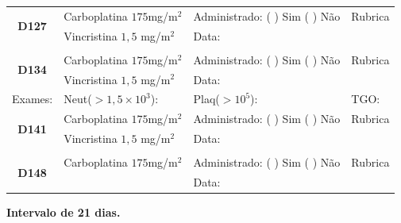 \documentclass[11pt,a4paper,oldfontcommands]{memoir}
\begin{document}
\begin{center}
\begin{longtable}{p{1cm}p{4cm}|p{5cm}|p{3cm}}
    \hline
    \multicolumn{1}{c|}{\multirow{2}{*}{\textbf{D127}}}&{Carboplatina \(175\)mg/m\(^2\)}&{Administrado: (  ) Sim (  ) Não}&{Rubrica}\\
    \multicolumn{1}{c|}{}&{Vincristina \(1,5\) mg/m\(^2\)}&{Data:}&\\
    \hline
    \\
    \hline
    \multicolumn{1}{c|}{\multirow{2}{*}{\textbf{D134}}}&{Carboplatina \(175\)mg/m\(^2\)}&{Administrado: (  ) Sim (  ) Não}&{Rubrica}\\
    \multicolumn{1}{c|}{}&{Vincristina \(1,5\) mg/m\(^2\)}&{Data:}&\\
    \hline
    \multicolumn{1}{c|}{Exames:}&{Neut(\(>1,5\times10^3\)):}&{Plaq(\(>10^5\)):}&{TGO:}
    \\
    \hline

    \hline
    \multicolumn{1}{c|}{\multirow{2}{*}{\textbf{D141}}}&{Carboplatina \(175\)mg/m\(^2\)}&{Administrado: (  ) Sim (  ) Não}&{Rubrica}\\
    \multicolumn{1}{c|}{}&{Vincristina \(1,5\) mg/m\(^2\)}&{Data:}&\\
    \hline
    \\
    \hline
    \multicolumn{1}{c|}{\multirow{2}{*}{\textbf{D148}}}&{Carboplatina \(175\)mg/m\(^2\)}&{Administrado: (  ) Sim (  ) Não}&{Rubrica}\\
	\multicolumn{1}{c|}{}&&{Data:}&\\
    \hline
\end{longtable}
\textbf{Intervalo de 21 dias.}
\end{center}
\end{document}

